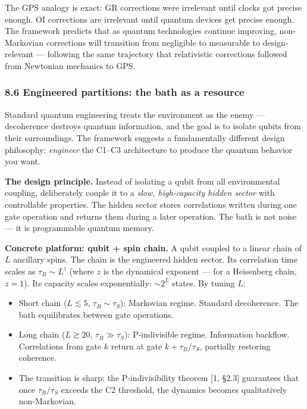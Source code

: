 \documentclass[
]{article}
\providecommand{\tightlist}{%
  \setlength{\itemsep}{0pt}\setlength{\parskip}{0pt}}
\begin{document}
The GPS analogy is exact: GR corrections were irrelevant until clocks
got precise enough. OI corrections are irrelevant until quantum devices
get precise enough. The framework predicts that as quantum technologies
continue improving, non-Markovian corrections will transition from
negligible to measurable to design-relevant --- following the same
trajectory that relativistic corrections followed from Newtonian
mechanics to GPS.

\hypertarget{engineered-partitions-the-bath-as-a-resource}{%
\subsubsection{8.6 Engineered partitions: the bath as a
resource}\label{engineered-partitions-the-bath-as-a-resource}}

Standard quantum engineering treats the environment as the enemy ---
decoherence destroys quantum information, and the goal is to isolate
qubits from their surroundings. The framework suggests a fundamentally
different design philosophy: \emph{engineer} the C1--C3 architecture to
produce the quantum behavior you want.

\textbf{The design principle.} Instead of isolating a qubit from all
environmental coupling, deliberately couple it to a \emph{slow,
high-capacity hidden sector} with controllable properties. The hidden
sector stores correlations written during one gate operation and returns
them during a later operation. The bath is not noise --- it is
programmable quantum memory.

\textbf{Concrete platform: qubit + spin chain.} A qubit coupled to a
linear chain of \(L\) ancillary spins. The chain is the engineered
hidden sector. Its correlation time scales as \(\tau_B \sim L^z\) (where
\(z\) is the dynamical exponent --- for a Heisenberg chain, \(z = 1\)).
Its capacity scales exponentially: \(\sim 2^L\) states. By tuning \(L\):

\begin{itemize}
\tightlist
\item
  Short chain (\(L \lesssim 5\), \(\tau_B \sim \tau_S\)): Markovian
  regime. Standard decoherence. The bath equilibrates between gate
  operations.
\item
  Long chain (\(L \gtrsim 20\), \(\tau_B \gg \tau_S\)): P-indivisible
  regime. Information backflow. Correlations from gate \(k\) return at
  gate \(k + \tau_B / \tau_S\), partially restoring coherence.
\item
  The transition is sharp: the P-indivisibility theorem {[}1, §2.3{]}
  guarantees that once \(\tau_B / \tau_S\) exceeds the C2 threshold, the
  dynamics becomes qualitatively non-Markovian.
\end{itemize}
\end{document}
